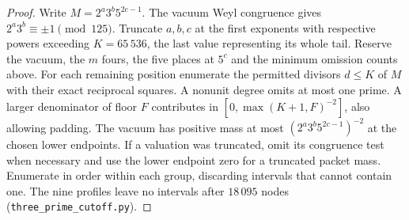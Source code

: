 \documentclass[11pt]{amsart}
\numberwithin{equation}{section}
\theoremstyle{definition}
\theoremstyle{plain}
\begin{document}
\begin{proof}
Write $M=2^a3^b5^{2c-1}$. The vacuum Weyl congruence gives
$2^a3^b\equiv\pm1\pmod{125}$. Truncate $a,b,c$ at the first
exponents with respective powers exceeding $K=65\,536$, the
last value representing its whole tail. Reserve the vacuum, the
$m$ fours, the five places at $5^c$ and the minimum omission
counts above. For each remaining position enumerate the permitted
divisors $d\le K$ of $M$ with their exact reciprocal squares.
A nonunit degree omits at most one prime. A larger denominator of
floor $F$ contributes in $[0,\max(K+1,F)^{-2}]$, also allowing
padding. The vacuum has positive mass at most $(2^a3^b5^{2c-1})^{-2}$ at the chosen lower endpoints.
If a valuation was truncated, omit its congruence test when necessary
and use the lower endpoint zero for a truncated packet mass.
Enumerate in order within each group, discarding intervals that
cannot contain one. The nine profiles leave no intervals after
$18\,095$ nodes (\texttt{three\_prime\_cutoff.py}).
\end{proof}
\end{document}
